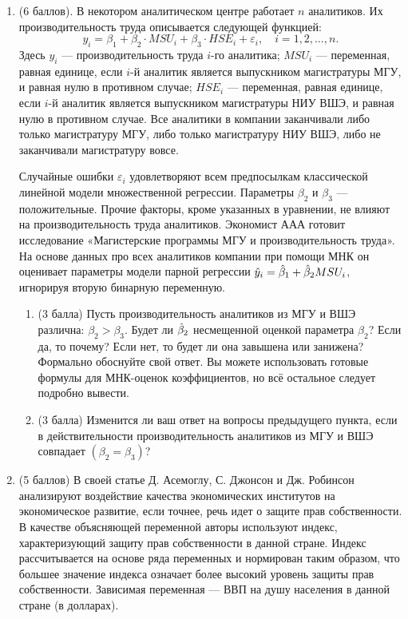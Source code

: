 \begin{enumerate}
    \item (6 баллов). В некотором аналитическом центре работает $n$ аналитиков. Их производительность труда описывается следующей функцией:
\[
y_i = \beta_1 + \beta_2 \cdot MSU_i+\beta_3 \cdot HSE_i+\varepsilon_i, \quad i=1,2, \ldots, n.
\]
Здесь $y_i$ — производительность труда $i$-го аналитика; $MSU_i$ — переменная, равная единице, если $i$-й аналитик является выпускником магистратуры МГУ, и равная нулю в противном случае; $HSE_i$ — переменная, равная единице, если $i$-й аналитик является выпускником магистратуры НИУ ВШЭ, и равная нулю в противном случае. Все аналитики в компании заканчивали либо только магистратуру МГУ, либо только магистратуру НИУ ВШЭ, либо не заканчивали магистратуру вовсе. 

Случайные ошибки $\varepsilon_i$ удовлетворяют всем предпосылкам классической линейной модели множественной регрессии. Параметры $\beta_2$ и $\beta_3$ — положительные.
Прочие факторы, кроме указанных в уравнении, не влияют на производительность труда аналитиков.
Экономист ААА готовит исследование «Магистерские программы МГУ и производительность труда». На основе данных про всех аналитиков компании при помощи МНК он оценивает параметры модели парной регрессии $\hat{y}_i = \hat{\beta}_1 + \hat{\beta}_2 MSU_i$, игнорируя вторую бинарную переменную.
\begin{enumerate}
    \item (3 балла) Пусть производительность аналитиков из МГУ и ВШЭ различна: $\beta_2 > \beta_3$. Будет ли $\hat{\beta}_2$ несмещенной оценкой параметра $\beta_2$? Если да, то почему? Если нет, то будет ли она завышена или занижена?
Формально обоснуйте свой ответ. Вы можете использовать готовые формулы для МНК-оценок коэффициентов, но всё остальное следует подробно вывести.
\item (3 балла) Изменится ли ваш ответ на вопросы предыдущего пункта, если в действительности производительность аналитиков из МГУ и ВШЭ совпадает $(\beta_2 = \beta_3)$?
\end{enumerate}

    \item (5 баллов) В своей статье Д. Асемоглу, С. Джонсон и Дж. Робинсон анализируют
    воздействие качества экономических институтов на экономическое развитие,
    если точнее, речь идет о защите прав собственности. 
    В качестве объясняющей переменной авторы используют индекс, характеризующий защиту прав собственности в данной стране. 
    Индекс рассчитывается на основе ряда переменных и нормирован таким образом, что большее значение индекса означает более высокий уровень защиты прав собственности. 
    Зависимая переменная — ВВП на душу населения в данной стране (в долларах).
    

\end{enumerate}
